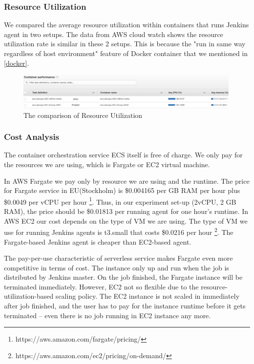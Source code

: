 \subsubsection{Resource Utilization}
We compared the average resource utilization within containers that runs Jenkins agent in two setups. The data from AWS cloud watch shows the resource utilization rate is similar in these 2 setups. This is because the "run in same way regardless of host environment" \cite{WhatisaC60:online} feature of Docker container that we mentioned in \ref{docker}.
\begin{figure}[h]
\centering
\includegraphics[width=0.99\textwidth]{pics/utilizationecs.png}
\caption{The comparison of Resource Utilization}
\label{fig:utilizationecs}
\end{figure}
\subsubsection{Cost Analysis}
The container orchestration service ECS itself is free of charge. We only pay for the resources we are using, which is Fargate or EC2 virtual machine.
\par
In AWS Fargate we pay only by resource we are using and the runtime. The price for Fargate service in EU(Stockholm) is \$0.004165 per GB RAM per hour plus \$0.0049 per vCPU per hour \footnote{https://aws.amazon.com/fargate/pricing/}. Thus, in our experiment set-up (2vCPU, 2 GB RAM), the price should be \$0.01813 per running agent for one hour's runtime.
In AWS EC2 our cost depends on the type of VM we are using. The type of VM we use for running Jenkins agents is t3.small that costs \$0.0216 per hour \footnote{https://aws.amazon.com/ec2/pricing/on-demand/}. The Fargate-based Jenkins agent is cheaper than EC2-based agent.
\par
The pay-per-use characteristic of serverless service makes Fargate even more competitive in terms of cost. The instance only up and run when the job is distributed by Jenkins master. On the job finished, the Fargate instance will be terminated immediately. However, EC2 not so flexible due to the resource-utilization-based scaling policy. The EC2 instance is not scaled in immediately after job finished, and the user has to pay for the instance runtime before it gets terminated -- even there is no job running in EC2 instance any more.
